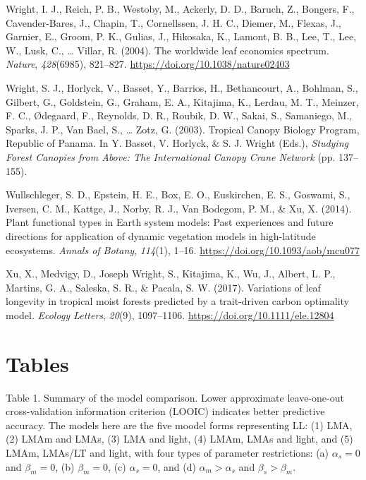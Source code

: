 \documentclass[
  12pt,
  a4paper,
,tablecaptionabove
]{scrartcl}
\newlength{\cslhangindent}
\newenvironment{CSLReferences}[2] %
 {%
  \setlength{\parindent}{0pt}
  \ifodd #1 \everypar{\setlength{\hangindent}{\cslhangindent}}\ignorespaces\fi
  \ifnum #2 > 0
  \setlength{\parskip}{#2\baselineskip}
  \fi
 }%
 {}
\begin{document}
\begin{CSLReferences}{1}{0}
\leavevmode{}%
Wright, I. J., Reich, P. B., Westoby, M., Ackerly, D. D., Baruch, Z.,
Bongers, F., Cavender-Bares, J., Chapin, T., Cornellssen, J. H. C.,
Diemer, M., Flexas, J., Garnier, E., Groom, P. K., Gulias, J., Hikosaka,
K., Lamont, B. B., Lee, T., Lee, W., Lusk, C., \ldots{} Villar, R.
(2004). The worldwide leaf economics spectrum. \emph{Nature},
\emph{428}(6985), 821--827. \url{https://doi.org/10.1038/nature02403}

\leavevmode{}%
Wright, S. J., Horlyck, V., Basset, Y., Barrios, H., Bethancourt, A.,
Bohlman, S., Gilbert, G., Goldstein, G., Graham, E. A., Kitajima, K.,
Lerdau, M. T., Meinzer, F. C., Ødegaard, F., Reynolds, D. R., Roubik, D.
W., Sakai, S., Samaniego, M., Sparks, J. P., Van Bael, S., \ldots{}
Zotz, G. (2003). Tropical {Canopy Biology Program}, {Republic} of
{Panama}. In Y. Basset, V. Horlyck, \& S. J. Wright (Eds.),
\emph{Studying {Forest Canopies} from {Above}: {The International Canopy
Crane Network}} (pp. 137--155).

\leavevmode{}%
Wullschleger, S. D., Epstein, H. E., Box, E. O., Euskirchen, E. S.,
Goswami, S., Iversen, C. M., Kattge, J., Norby, R. J., Van Bodegom, P.
M., \& Xu, X. (2014). Plant functional types in {Earth} system models:
{Past} experiences and future directions for application of dynamic
vegetation models in high-latitude ecosystems. \emph{Annals of Botany},
\emph{114}(1), 1--16. \url{https://doi.org/10.1093/aob/mcu077}

\leavevmode{}%
Xu, X., Medvigy, D., Joseph Wright, S., Kitajima, K., Wu, J., Albert, L.
P., Martins, G. A., Saleska, S. R., \& Pacala, S. W. (2017). Variations
of leaf longevity in tropical moist forests predicted by a trait-driven
carbon optimality model. \emph{Ecology Letters}, \emph{20}(9),
1097--1106. \url{https://doi.org/10.1111/ele.12804}

\end{CSLReferences}

\newpage

\hypertarget{tables}{%
\section{Tables}\label{tables}}

Table 1. Summary of the model comparison. Lower approximate
leave-one-out cross-validation information criterion (LOOIC) indicates
better predictive accuracy. The models here are the five moodel forms
representing LL: (1) LMA, (2) LMAm and LMAs, (3) LMA and light, (4)
LMAm, LMAs and light, and (5) LMAm, LMAs/LT and light, with four types
of parameter restrictions: (a) \(\alpha_s = 0\) and \(\beta_m = 0\), (b)
\(\beta_m = 0\), (c) \(\alpha_s = 0\), and (d) \(\alpha_m > \alpha_s\)
and \(\beta_s > \beta_m\).
\end{document}
